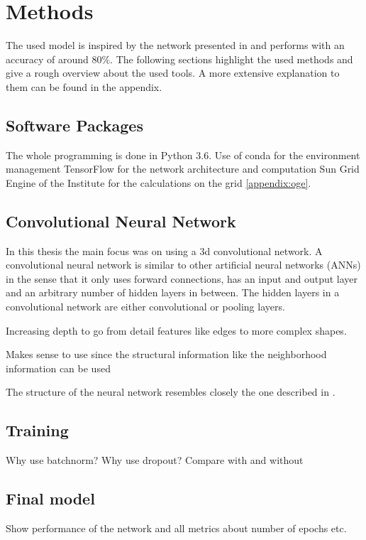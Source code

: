 \documentclass[main.tex]{subfiles}
\begin{document}
\chapter{Methods}
The used model is inspired by the network presented in \cite{huang2017lung} and performs with an accuracy of around 80$\%$. The following sections highlight the used methods and give a rough overview about the used tools. A more extensive explanation to them can be found in the appendix.


\section{Software Packages}
The whole programming is done in Python 3.6. 
Use of conda for the environment management 
TensorFlow for the network architecture and computation
Sun Grid Engine of the Institute for the calculations on the grid \ref{appendix:oge}.


\section{Convolutional Neural Network}
In this thesis the main focus was on using a 3d convolutional network. A convolutional neural network is similar to other artificial neural networks (ANNs) in the sense that it only uses forward connections, has an input and output layer and an arbitrary number of hidden layers in between. The hidden layers in a convolutional network are either convolutional or pooling layers. 

Increasing depth to go from detail features like edges to more complex shapes.

Makes sense to use since the structural information like the neighborhood information can be used



The structure of the neural network resembles closely the one described in \cite{huang2017lung}. 



\section{Training}
Why use batchnorm?
Why use dropout?
Compare with and without

\section{Final model}
Show performance of the network and all metrics about number of epochs etc.
\end{document}
